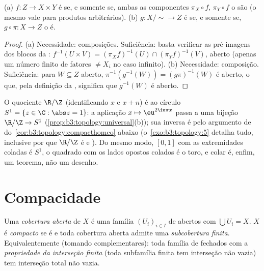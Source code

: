 \begin{proposition}
\label{prop:b3:topology:universal}
(a) $f \colon Z \to X \times Y$ é  se, e somente se, ambas as componentes $\pi_X \circ f$,
$\pi_Y \circ f$ o são (o mesmo vale para produtos arbitrários).
(b) $g \colon X/{\sim} \to Z$ é  se, e somente se, $g \circ \pi
\colon X \to Z$ o é.
\end{proposition}

\begin{proof}
(a) Necessidade: composições. Suficiência: basta verificar as
pré-imagens dos blocos da : $f^{-1}(U \times V) = (\pi_Xf)^{-1}(U)
\cap (\pi_Yf)^{-1}(V)$, aberto (apenas um número finito
de fatores $\neq X_i$ no caso infinito). (b) Necessidade: composição.
Suficiência: para $W \subseteq Z$ aberto, $\pi^{-1}(g^{-1}(W)) = (g\pi)^{-1}(W)$ é aberto, o que, pela definição
da , significa que $g^{-1}(W)$ é aberto.
\end{proof}

\begin{example}\label{ex:b3:topology:circle}
O quociente $\R/\Z$ (identificando $x$ e $x + n$) é
 ao círculo $S^1 = \{z \in \C : \abs z = 1\}$: a aplicação $x
\mapsto \eu^{2\iu\pi x}$ passa a uma bijeção
 $\R/\Z \to S^1$ (\cref{prop:b3:topology:universal}(b)); sua inversa é  pelo
argumento de  do~\cref{cor:b3:topology:compacthomeo} abaixo (o~\cref{exo:b3:topology:5}
detalha tudo, inclusive por que $\R/\Z$ é  e ).
Do mesmo modo, $[0,1]$ com as extremidades coladas é $S^1$, o
quadrado com os lados opostos colados é o toro, e colar é, enfim, um
teorema, não um desenho.
\end{example}

\section{Compacidade}

\begin{definition}\label{def:b3:topology:compact}
Uma \emph{cobertura aberta} de $X$ é uma família $(U_i)_{i\in I}$ de abertos
com $\bigcup U_i = X$. $X$ é \emph{compacto} se é  e toda cobertura aberta admite uma \emph{subcobertura
finita}. Equivalentemente (tomando complementares): toda família de
fechados com a \emph{propriedade da interseção finita} (toda
subfamília finita tem interseção não vazia) tem interseção total não
vazia.
\end{definition}

